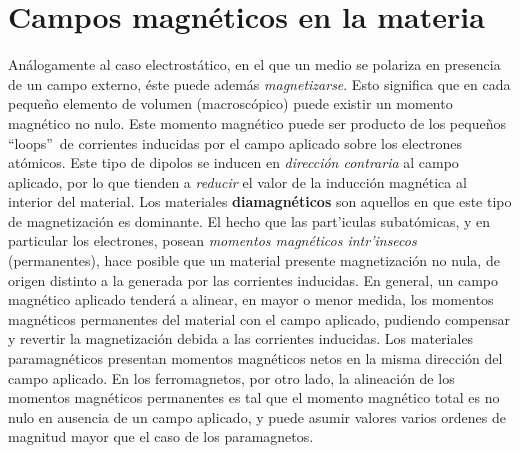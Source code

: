 \section{Campos magnéticos en la materia}
Análogamente al caso electrostático, en el que un medio se polariza en
presencia de un campo externo, éste puede además \textit{magnetizarse}. Esto
significa que en cada peque\~no elemento de volumen (macroscópico) puede existir un momento magnético no nulo. Este momento magnético puede ser producto de
los peque\~nos ``loops''\, de corrientes inducidas por el campo aplicado sobre los
electrones atómicos. Este tipo de dipolos se inducen en \textit{dirección contraria}
al campo aplicado, por lo que tienden a \textit{reducir} el valor de la inducción
magnética al interior del material. Los materiales \textbf{diamagnéticos} son aquellos en que este tipo de magnetización es dominante. El hecho que las
part'iculas subatómicas, y en particular los electrones, posean \textit{momentos
magnéticos intr'insecos} (permanentes), hace posible que un material presente
magnetización no nula, de origen distinto a la generada por las corrientes
inducidas. En general, un campo magnético aplicado tenderá a alinear, en
mayor o menor medida, los momentos magnéticos permanentes del material con el campo aplicado, pudiendo compensar y revertir la magnetización debida a las corrientes
inducidas. Los materiales paramagnéticos presentan momentos magnéticos
netos en la misma dirección del campo aplicado. En los ferromagnetos, por
otro lado, la alineación de los momentos magnéticos permanentes es tal que el
momento magnético total es no nulo en ausencia de un campo aplicado, y puede asumir valores varios ordenes de magnitud mayor que el caso de los paramagnetos.

